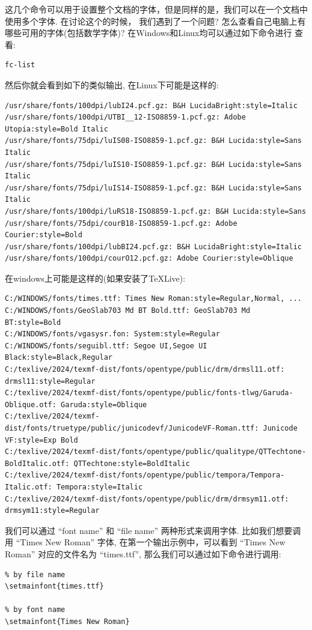 这几个命令可以用于设置整个文档的字体，但是同样的是，我们可以在一个文档中使用多个字体. 在讨论这个的时候，
我们遇到了一个问题? 怎么查看自己电脑上有哪些可用的字体(包括数学字体)? 在Windows和Linux均可以通过如下命令进行
查看:
\begin{verbatim}
fc-list 
\end{verbatim}

然后你就会看到如下的类似输出, 在Linux下可能是这样的:
\begin{verbatim}
/usr/share/fonts/100dpi/lubI24.pcf.gz: B&H LucidaBright:style=Italic
/usr/share/fonts/100dpi/UTBI__12-ISO8859-1.pcf.gz: Adobe Utopia:style=Bold Italic
/usr/share/fonts/75dpi/luIS08-ISO8859-1.pcf.gz: B&H Lucida:style=Sans Italic
/usr/share/fonts/75dpi/luIS10-ISO8859-1.pcf.gz: B&H Lucida:style=Sans Italic
/usr/share/fonts/75dpi/luIS14-ISO8859-1.pcf.gz: B&H Lucida:style=Sans Italic
/usr/share/fonts/100dpi/luRS18-ISO8859-1.pcf.gz: B&H Lucida:style=Sans
/usr/share/fonts/75dpi/courB18-ISO8859-1.pcf.gz: Adobe Courier:style=Bold
/usr/share/fonts/100dpi/lubBI24.pcf.gz: B&H LucidaBright:style=Italic
/usr/share/fonts/100dpi/courO12.pcf.gz: Adobe Courier:style=Oblique
\end{verbatim}

在windows上可能是这样的(如果安装了\TeX{}Live):
\begin{verbatim}
C:/WINDOWS/fonts/times.ttf: Times New Roman:style=Regular,Normal, ...
C:/WINDOWS/fonts/GeoSlab703 Md BT Bold.ttf: GeoSlab703 Md BT:style=Bold
C:/WINDOWS/fonts/vgasysr.fon: System:style=Regular
C:/WINDOWS/fonts/seguibl.ttf: Segoe UI,Segoe UI Black:style=Black,Regular
C:/texlive/2024/texmf-dist/fonts/opentype/public/drm/drmsl11.otf: drmsl11:style=Regular
C:/texlive/2024/texmf-dist/fonts/opentype/public/fonts-tlwg/Garuda-Oblique.otf: Garuda:style=Oblique
C:/texlive/2024/texmf-dist/fonts/truetype/public/junicodevf/JunicodeVF-Roman.ttf: Junicode VF:style=Exp Bold
C:/texlive/2024/texmf-dist/fonts/opentype/public/qualitype/QTTechtone-BoldItalic.otf: QTTechtone:style=BoldItalic
C:/texlive/2024/texmf-dist/fonts/opentype/public/tempora/Tempora-Italic.otf: Tempora:style=Italic
C:/texlive/2024/texmf-dist/fonts/opentype/public/drm/drmsym11.otf: drmsym11:style=Regular
\end{verbatim}

我们可以通过 ``font name'' 和  ``file name'' 两种形式来调用字体. 比如我们想要调用 ``Times New Roman'' 字体,
在第一个输出示例中，可以看到 ``Times New Roman'' 对应的文件名为 ``times.ttf'', 那么我们可以通过如下命令进行调用:
\begin{verbatim}
% by file name 
\setmainfont{times.ttf}

% by font name
\setmainfont{Times New Roman}
\end{verbatim}

